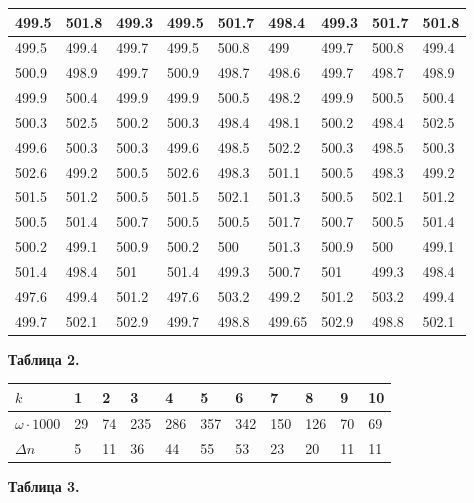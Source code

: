 \documentclass[a4paper,12pt]{article}
\begin{document}
\begin{table}[!ht]
\begin{tabular}{|l|l|l|l|l|l|l|l|l|}
        499.5 & 501.8 & 499.3 & 499.5 & 501.7 & 498.4 & 499.3 & 501.7 & 501.8 \\ \hline
        499.5 & 499.4 & 499.7 & 499.5 & 500.8 & 499 & 499.7 & 500.8 & 499.4 \\ \hline
        500.9 & 498.9 & 499.7 & 500.9 & 498.7 & 498.6 & 499.7 & 498.7 & 498.9 \\ \hline
        499.9 & 500.4 & 499.9 & 499.9 & 500.5 & 498.2 & 499.9 & 500.5 & 500.4 \\ \hline
        500.3 & 502.5 & 500.2 & 500.3 & 498.4 & 498.1 & 500.2 & 498.4 & 502.5 \\ \hline
        499.6 & 500.3 & 500.3 & 499.6 & 498.5 & 502.2 & 500.3 & 498.5 & 500.3 \\ \hline
        502.6 & 499.2 & 500.5 & 502.6 & 498.3 & 501.1 & 500.5 & 498.3 & 499.2 \\ \hline
        501.5 & 501.2 & 500.5 & 501.5 & 502.1 & 501.3 & 500.5 & 502.1 & 501.2 \\ \hline
        500.5 & 501.4 & 500.7 & 500.5 & 500.5 & 501.7 & 500.7 & 500.5 & 501.4 \\ \hline
        500.2 & 499.1 & 500.9 & 500.2 & 500 & 501.3 & 500.9 & 500 & 499.1 \\ \hline
        501.4 & 498.4 & 501 & 501.4 & 499.3 & 500.7 & 501 & 499.3 & 498.4 \\ \hline
        497.6 & 499.4 & 501.2 & 497.6 & 503.2 & 499.2 & 501.2 & 503.2 & 499.4 \\ \hline
        499.7 & 502.1 & 502.9 & 499.7 & 498.8 & 499.65 & 502.9 & 498.8 & 502.1 \\ \hline
    \end{tabular}
\end{table}
\newpage
    \begin{flushright}
        \textbf{Таблица 2.}
 \end{flushright}
\begin{table}[!ht]
    \centering
    \begin{tabular}{|l|l|l|l|l|l|l|l|l|l|l|}
    \hline
        $k$ & 1 & 2 & 3 & 4 & 5 & 6 & 7 & 8 & 9 & 10 \\ \hline
        $\omega \cdot 1000$ & 29 & 74 & 235 & 286 & 357 & 342 & 150 & 126 & 70 & 69 \\ \hline
        $\Delta n$ & 5 & 11 & 36 & 44 & 55 & 53 & 23 & 20 & 11 & 11 \\ \hline
    \end{tabular}
\end{table}
    \begin{flushright}
        \textbf{Таблица 3.}
 \end{flushright}
\end{document}
